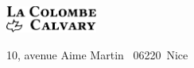 \begin{titlepage}
\begin{center}
\mbox{}
\vfill
{}
\vfill
\enlargethispage{\footskip}
\includegraphics[width=3cm]{colombecalvary.pdf}

10, avenue Aime Martin \mybullet~06220~Nice
\end{center}
\end{titlepage}
\pagebreak

